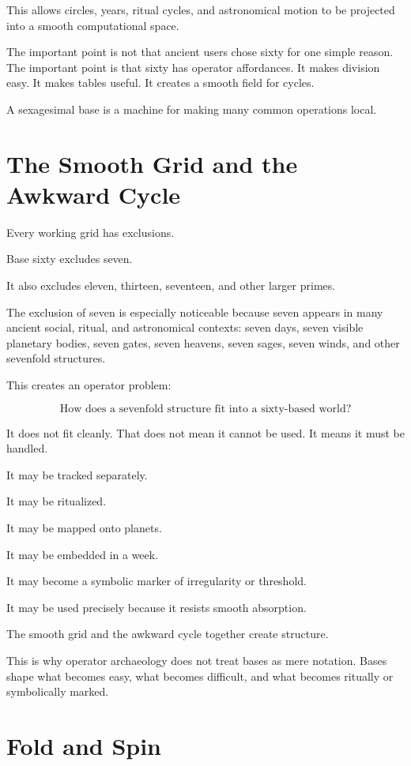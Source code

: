 \documentclass[11pt]{book}
\begin{document}
This allows circles, years, ritual cycles, and astronomical motion to be projected into a smooth computational space.

The important point is not that ancient users chose sixty for one simple reason. The important point is that sixty has operator affordances. It makes division easy. It makes tables useful. It creates a smooth field for cycles.

A sexagesimal base is a machine for making many common operations local.

\section{The Smooth Grid and the Awkward Cycle}

Every working grid has exclusions.

Base sixty excludes seven.

It also excludes eleven, thirteen, seventeen, and other larger primes.

The exclusion of seven is especially noticeable because seven appears in many ancient social, ritual, and astronomical contexts: seven days, seven visible planetary bodies, seven gates, seven heavens, seven sages, seven winds, and other sevenfold structures.

This creates an operator problem:

\[
\text{How does a sevenfold structure fit into a sixty-based world?}
\]

It does not fit cleanly. That does not mean it cannot be used. It means it must be handled.

It may be tracked separately.

It may be ritualized.

It may be mapped onto planets.

It may be embedded in a week.

It may become a symbolic marker of irregularity or threshold.

It may be used precisely because it resists smooth absorption.

The smooth grid and the awkward cycle together create structure.

This is why operator archaeology does not treat bases as mere notation. Bases shape what becomes easy, what becomes difficult, and what becomes ritually or symbolically marked.

\section{Fold and Spin}
\end{document}
